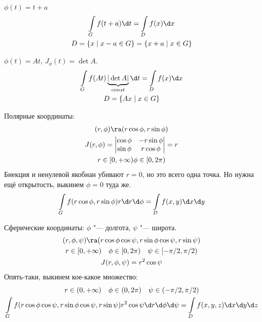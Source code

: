 \begin{exmp}
	$\phi(t) = t + a$
	\begin{gather*}
		\int\limits_G f(t + a) \d t = \int\limits_D f(x) \d x \\
		D = \{x \mid x - a \in G\} = \{x+a \mid x \in G\}
	\end{gather*}
\end{exmp}

\begin{exmp}
	$\phi(t) = At$, $J_\phi(t) = \det A$.
	\begin{gather*}
		\int\limits_G f(At) \underbrace{|\det A|}_{const} \d t = \int\limits_D f(x) \d x \\
		D = \{Ax \mid x \in G\}
	\end{gather*}
\end{exmp}

\begin{exmp}
	Полярные координаты:
	\begin{gather*}
		(r, \phi) \ra (r \cos \phi, r \sin \phi) \\
		J(r, \phi) = \begin{vmatrix} \cos \phi & -r \sin \phi \\ \sin \phi & r \cos \phi \end{vmatrix} = r \\
		r \in [0, +\infty) \phi \in [0, 2\pi)
	\end{gather*}
	Биекция и ненулевой якобиан убивают $r = 0$, но это всего одна точка.
	Но нужна ещё открытость, выкинем $\phi = 0$ туда же.
	\begin{gather*}
		\int\limits_G f(r \cos \phi, r \sin \phi) r \d r \d \phi = \int\limits_D f(x, y) \d x \d y
	\end{gather*}
\end{exmp}

\begin{exmp}
	Сферические координаты: $\phi$ "--- долгота, $\psi$ "--- широта.
	\begin{gather*}
		(r, \phi, \psi) \ra (r \cos \phi \cos \psi, r \sin \phi \cos \psi, r \sin \psi) \\
		r \in [0, +\infty) \quad \phi \in [0, 2\pi) \quad \psi \in [-\pi/2, \pi/2) \\
		J(r, \phi, \psi) = r^2 \cos \psi
	\end{gather*}
	Опять-таки, выкинем кое-какое множество:
	\begin{gather*}
		r \in (0, +\infty) \quad \phi \in (0, 2\pi) \quad \psi \in (-\pi/2, \pi/2) \\
		\int\limits_G f(r \cos \phi \cos \psi, r \sin \phi \cos \psi, r \sin \psi) r^2 \cos \psi \d r \d \phi \d \psi
		= \int\limits_D f(x, y, z) \d x \d y \d z
	\end{gather*}
\end{exmp}

